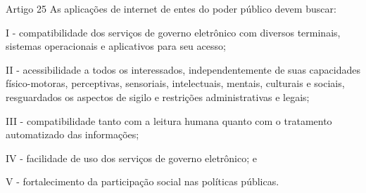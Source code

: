 \begin{frame}{Artigo 25}
As aplicações de internet de entes do poder público devem buscar:

I - compatibilidade dos serviços de governo eletrônico com diversos terminais, sistemas operacionais e aplicativos para seu acesso;

II - acessibilidade a todos os interessados, independentemente de suas capacidades físico-motoras, perceptivas, sensoriais, intelectuais, mentais, culturais e sociais, resguardados os aspectos de sigilo e restrições administrativas e legais;

III - compatibilidade tanto com a leitura humana quanto com o tratamento automatizado das informações;

IV - facilidade de uso dos serviços de governo eletrônico; e

V - fortalecimento da participação social nas políticas públicas.
\end{frame}